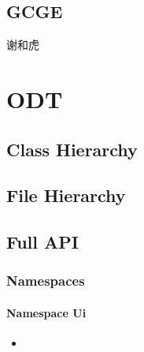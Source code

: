 \documentclass[letterpaper,10pt,english]{sphinxmanual}
\begin{document}
\section{GCGE}
\label{\detokenize{src/gcge/main:id1}}
\sphinxAtStartPar
谢和虎

\sphinxstepscope


\chapter{ODT}
\label{\detokenize{api/library_root:odt}}\label{\detokenize{api/library_root::doc}}

\section{Class Hierarchy}
\label{\detokenize{api/library_root:class-hierarchy}}



\section{File Hierarchy}
\label{\detokenize{api/library_root:file-hierarchy}}



\section{Full API}
\label{\detokenize{api/library_root:full-api}}

\subsection{Namespaces}
\label{\detokenize{api/library_root:namespaces}}
\sphinxstepscope


\subsubsection{Namespace Ui}
\label{\detokenize{api/namespace_Ui:namespace-ui}}\label{\detokenize{api/namespace_Ui:id1}}\label{\detokenize{api/namespace_Ui::doc}}
\begin{sphinxShadowBox}
\begin{itemize}
\item {} 
\sphinxAtStartPar
{}\label{\detokenize{api/namespace_Ui:id2}}{\hyperref[\detokenize{api/namespace_Ui:classes}]{}}

\end{itemize}
\end{sphinxShadowBox}
\end{document}
